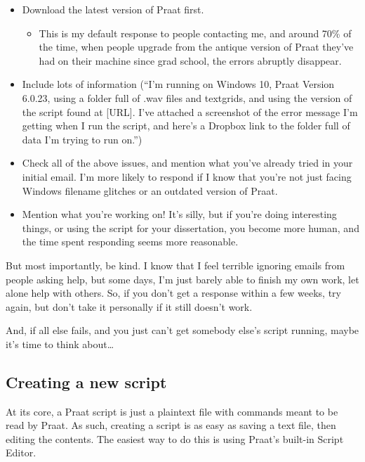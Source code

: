 \begin{itemize}
\tightlist
\item
  Download the latest version of Praat first.

  \begin{itemize}
  \tightlist
  \item
    This is my default response to people contacting me, and around 70\%
    of the time, when people upgrade from the antique version of Praat
    they've had on their machine since grad school, the errors abruptly
    disappear.
  \end{itemize}
\item
  Include lots of information (``I'm running on Windows 10, Praat
  Version 6.0.23, using a folder full of .wav files and textgrids, and
  using the version of the script found at {[}URL{]}. I've attached a
  screenshot of the error message I'm getting when I run the script, and
  here's a Dropbox link to the folder full of data I'm trying to run
  on.'')
\item
  Check all of the above issues, and mention what you've already tried
  in your initial email. I'm more likely to respond if I know that
  you're not just facing Windows filename glitches or an outdated
  version of Praat.
\item
  Mention what you're working on! It's silly, but if you're doing
  interesting things, or using the script for your dissertation, you
  become more human, and the time spent responding seems more
  reasonable.
\end{itemize}

But most importantly, be kind. I know that I feel terrible ignoring
emails from people asking help, but some days, I'm just barely able to
finish my own work, let alone help with others. So, if you don't get a
response within a few weeks, try again, but don't take it personally if
it still doesn't work.

And, if all else fails, and you just can't get somebody else's script
running, maybe it's time to think about\ldots{}

\hypertarget{creating-a-new-script}{%
\subsection{Creating a new script}\label{creating-a-new-script}}

At its core, a Praat script is just a plaintext file with commands meant
to be read by Praat. As such, creating a script is as easy as saving a
text file, then editing the contents. The easiest way to do this is
using Praat's built-in Script Editor.

